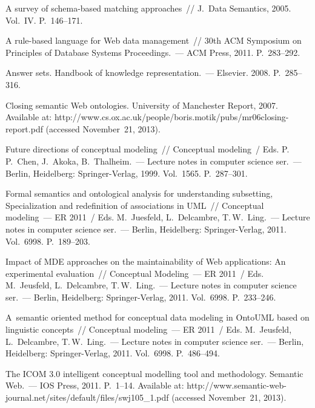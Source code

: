 \begin{multicols}{2}
{{\begin{thebibliography}{99}
 A survey of schema-based matching approaches~// J.~Data
Semantics, 2005. Vol.~IV. P.~146--171.

  A rule-based language for
Web data management~// 30th ACM Symposium on Principles of Database Systems
Proceedings.~--- ACM Press, 2011. P.~283--292.

 Answer sets. Handbook of knowledge representation.~--- Elsevier. 2008.
P.~285--316.


 Closing semantic Web ontologies. University of Manchester
Report, 2007. Available at: {\sf
http://www.cs.ox.ac.uk/people/boris.motik/pubs/\linebreak mr06closing-report.pdf} (accessed
November~21, 2013).

  Future directions of conceptual modeling~//
Conceptual modeling~/ Eds. P.\,P.~Chen, J.~Akoka, B.~Thalheim.~---
Lecture notes in computer science ser.~--- Berlin, Heidelberg:
Springer-Verlag, 1999. Vol.~1565. P.~287--301.

 Formal semantics and
ontological analysis for understanding subsetting, Specialization and redefinition of
associations in UML~// Conceptual modeling~--- ER 2011~/
Eds. M.~Juesfeld, L.~Delcambre, T.\,W.~Ling.~--- Lecture notes in computer
science ser.~--- Berlin, Heidelberg: Springer-Verlag, 2011.
Vol.~6998. P.~189--203.

 Impact of MDE
approaches on the maintainability of Web applications: An experimental evaluation~//
Conceptual Modeling~--- ER 2011~/ Eds. M.~Jeusfeld, L.~Delcambre, T.\,W.~Ling.~---
 Lecture notes in computer
science ser.~--- Berlin, Heidelberg: Springer-Verlag, 2011. Vol.~6998. P.~233--246.

  A~semantic oriented method
for conceptual data modeling in OntoUML based on linguistic concepts~// Conceptual
modeling~--- ER 2011~/ Eds. M.~Jeusfeld, L.~Delcambre,  T.\,W.~Ling.~--- Lecture notes in computer
science ser.~--- Berlin, Heidelberg: Springer-Verlag, 2011. Vol.~6998. P.~486--494.

 The ICOM 3.0 intelligent conceptual
modelling tool and methodology. Semantic Web.~--- IOS Press, 2011. P.~1--14. Available
at: {\sf http://www.semantic-web-journal.\linebreak net/sites/default/files/swj105\_1.pdf} (accessed
November~21, 2013).


\end{thebibliography}}}
\end{multicols}
